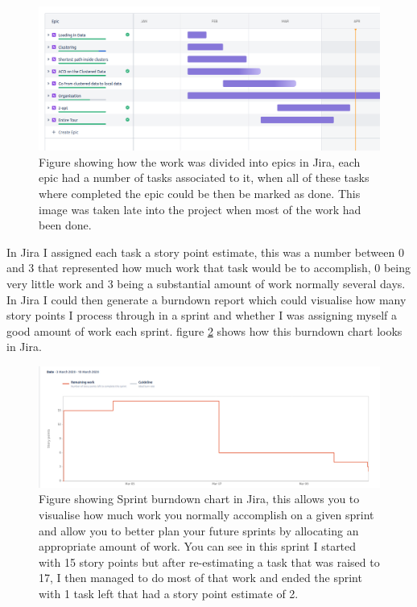 \begin{figure}
    \centering
    \includegraphics[width=\textwidth]{figures/jira_epics.png}
    \caption{Figure showing how the work was divided into epics in Jira, each epic had a number of tasks associated to it, when all of these tasks where completed the epic could be then be marked as done. This image was taken late into the project when most of the work had been done.}
    \label{fig:jira_epics}
\end{figure}

In Jira I assigned each task a story point estimate, this was a number between 0 and 3 that represented how much work that task would be to accomplish, 0 being very little work and 3 being a substantial amount of work normally several days. In Jira I could then generate a burndown report which could visualise how many story points I process through in a sprint and whether I was assigning myself a good amount of work each sprint. figure \ref{fig:jira_burndown} shows how this burndown chart looks in Jira.

\begin{figure}
    \centering
    \includegraphics[width=\textwidth]{figures/jira_sprint_burndown.png}
    \caption{Figure showing Sprint burndown chart in Jira, this allows you to visualise how much work you normally accomplish on a given sprint and allow you to better plan your future sprints by allocating an appropriate amount of work. You can see in this sprint I started with 15 story points but after re-estimating a task that was raised to 17, I then managed to do most of that work and ended the sprint with 1 task left that had a story point estimate of 2.}
    \label{fig:jira_burndown}
\end{figure}

